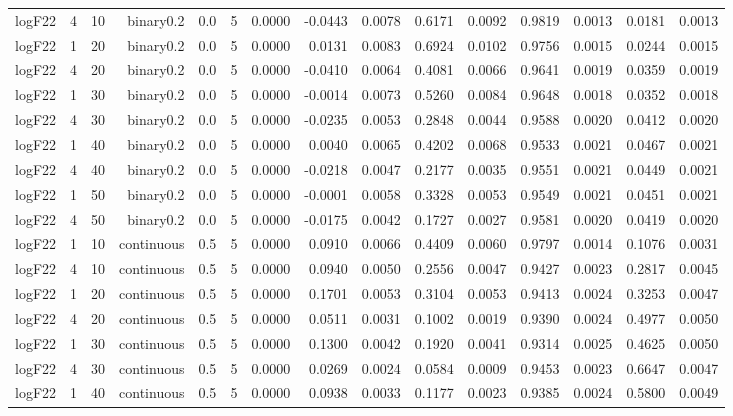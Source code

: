 \begin{longtable}{rrrrrrrrrrrrrrr}
  logF22 & 4 & 10 & binary0.2 & 0.0 & 5 & 0.0000 & -0.0443 & 0.0078 & 0.6171 & 0.0092 & 0.9819 & 0.0013 & 0.0181 & 0.0013 \\ 
  logF22 & 1 & 20 & binary0.2 & 0.0 & 5 & 0.0000 & 0.0131 & 0.0083 & 0.6924 & 0.0102 & 0.9756 & 0.0015 & 0.0244 & 0.0015 \\ 
  logF22 & 4 & 20 & binary0.2 & 0.0 & 5 & 0.0000 & -0.0410 & 0.0064 & 0.4081 & 0.0066 & 0.9641 & 0.0019 & 0.0359 & 0.0019 \\ 
  logF22 & 1 & 30 & binary0.2 & 0.0 & 5 & 0.0000 & -0.0014 & 0.0073 & 0.5260 & 0.0084 & 0.9648 & 0.0018 & 0.0352 & 0.0018 \\ 
  logF22 & 4 & 30 & binary0.2 & 0.0 & 5 & 0.0000 & -0.0235 & 0.0053 & 0.2848 & 0.0044 & 0.9588 & 0.0020 & 0.0412 & 0.0020 \\ 
  logF22 & 1 & 40 & binary0.2 & 0.0 & 5 & 0.0000 & 0.0040 & 0.0065 & 0.4202 & 0.0068 & 0.9533 & 0.0021 & 0.0467 & 0.0021 \\ 
  logF22 & 4 & 40 & binary0.2 & 0.0 & 5 & 0.0000 & -0.0218 & 0.0047 & 0.2177 & 0.0035 & 0.9551 & 0.0021 & 0.0449 & 0.0021 \\ 
  logF22 & 1 & 50 & binary0.2 & 0.0 & 5 & 0.0000 & -0.0001 & 0.0058 & 0.3328 & 0.0053 & 0.9549 & 0.0021 & 0.0451 & 0.0021 \\ 
  logF22 & 4 & 50 & binary0.2 & 0.0 & 5 & 0.0000 & -0.0175 & 0.0042 & 0.1727 & 0.0027 & 0.9581 & 0.0020 & 0.0419 & 0.0020 \\ 
  logF22 & 1 & 10 & continuous & 0.5 & 5 & 0.0000 & 0.0910 & 0.0066 & 0.4409 & 0.0060 & 0.9797 & 0.0014 & 0.1076 & 0.0031 \\ 
  logF22 & 4 & 10 & continuous & 0.5 & 5 & 0.0000 & 0.0940 & 0.0050 & 0.2556 & 0.0047 & 0.9427 & 0.0023 & 0.2817 & 0.0045 \\ 
  logF22 & 1 & 20 & continuous & 0.5 & 5 & 0.0000 & 0.1701 & 0.0053 & 0.3104 & 0.0053 & 0.9413 & 0.0024 & 0.3253 & 0.0047 \\ 
  logF22 & 4 & 20 & continuous & 0.5 & 5 & 0.0000 & 0.0511 & 0.0031 & 0.1002 & 0.0019 & 0.9390 & 0.0024 & 0.4977 & 0.0050 \\ 
  logF22 & 1 & 30 & continuous & 0.5 & 5 & 0.0000 & 0.1300 & 0.0042 & 0.1920 & 0.0041 & 0.9314 & 0.0025 & 0.4625 & 0.0050 \\ 
  logF22 & 4 & 30 & continuous & 0.5 & 5 & 0.0000 & 0.0269 & 0.0024 & 0.0584 & 0.0009 & 0.9453 & 0.0023 & 0.6647 & 0.0047 \\ 
  logF22 & 1 & 40 & continuous & 0.5 & 5 & 0.0000 & 0.0938 & 0.0033 & 0.1177 & 0.0023 & 0.9385 & 0.0024 & 0.5800 & 0.0049 \\ 

\end{longtable}
